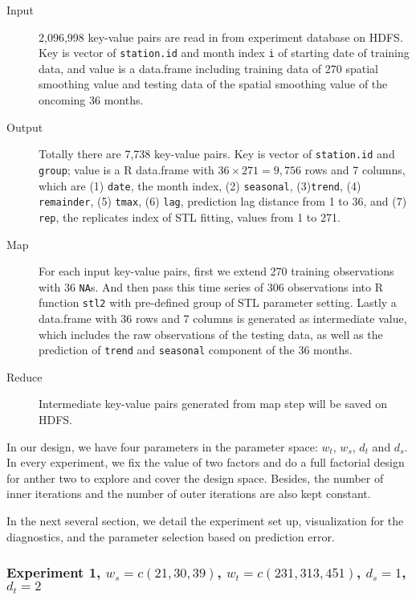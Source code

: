 \begin{description}
  \item[Input] 2,096,998 key-value pairs are read in from experiment database on 
  HDFS. Key is vector of \texttt{station.id} and month index \texttt{i} of 
  starting date of training data, and value is a data.frame including training 
  data of 270 spatial smoothing value and testing data of the spatial smoothing
  value of the oncoming 36 months.
  \item[Output] Totally there are 7,738 key-value pairs. 
  Key is vector of \texttt{station.id} and \texttt{group}; value is a R data.frame
  with $36 \times 271 = 9,756$ rows and 7 columns, which are (1) \texttt{date}, 
  the month index, (2) \texttt{seasonal}, (3)\texttt{trend}, (4) 
  \texttt{remainder}, (5) \texttt{tmax}, (6) \texttt{lag}, prediction lag 
  distance from 1 to 36, and (7) \texttt{rep}, the replicates index of STL 
  fitting, values from 1 to 271. 
  \item[Map] For each input key-value pairs, first we extend 270 training 
  observations with 36 \texttt{NA}s. And then pass this time series of 306 
  observations into R function \texttt{stl2} with pre-defined group of STL 
  parameter setting. Lastly a data.frame with 36 rows and 7 columns is generated
  as intermediate value, which includes the raw observations of the testing data, 
  as well as the prediction of \texttt{trend} and \texttt{seasonal} component of 
  the 36 months.
  \item[Reduce] Intermediate key-value pairs generated from map step will be saved
  on HDFS.
\end{description} 

In our design, we have four parameters in the parameter space: $w_t$, $w_s$, 
$d_t$ and $d_s$. In
every experiment, we fix the value of two factors and do a full factorial design
for anther two to explore and cover the design space. Besides, the number of inner
iterations and the number of outer iterations are also kept constant.

In the next several section, we detail the experiment set up, visualization for 
the diagnostics, and the parameter selection based on prediction error.

\subsubsection{Experiment 1,  
\textmd{$w_s=c(21, 30, 39)$, $w_t=c(231, 313, 451)$, $d_s=1$, $d_t=2$}
}

